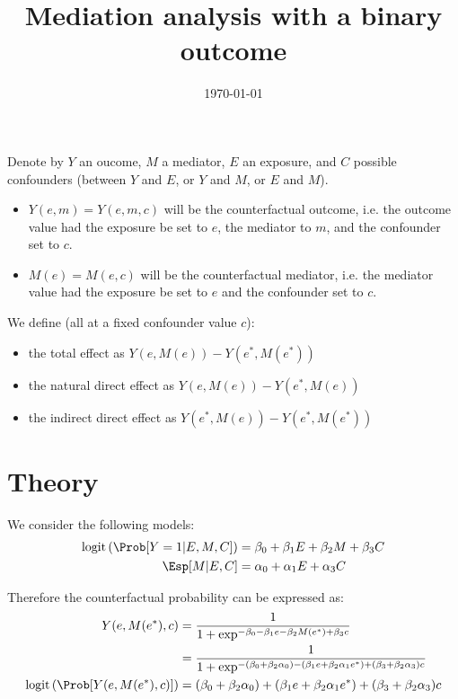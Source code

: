 \documentclass[12pt]{article}
\date{\today}
\title{Mediation analysis with a binary outcome}
\begin{document}
\maketitle
Denote by \(Y\) an oucome, \(M\) a mediator, \(E\) an exposure, and
\(C\) possible confounders (between \(Y\) and \(E\), or \(Y\) and
\(M\), or \(E\) and \(M\)).
\begin{itemize}
\item \(Y(e,m)=Y(e,m,c)\) will be the counterfactual outcome, i.e. the outcome
value had the exposure be set to \(e\), the mediator to \(m\), and the confounder set to \(c\).
\item \(M(e)=M(e,c)\) will be the counterfactual mediator, i.e. the mediator
value had the exposure be set to \(e\) and the confounder set to \(c\).
\end{itemize}

\bigskip

We define (all at a fixed confounder value \(c\)):
\begin{itemize}
\item the total effect as \(Y(e,M(e))-Y(e^*,M(e^*))\)
\item the natural direct effect as \(Y(e,M(e))-Y(e^*,M(e))\)
\item the indirect direct effect as \(Y(e^*,M(e))-Y(e^*,M(e^*))\)
\end{itemize}

\section{Theory}
\label{sec:orge90f290}
We consider the following models:
\begin{align*}
\text{logit}\left(\Prob[Y=1|E,M,C]\right) &= \beta_0 + \beta_1 E + \beta_2 M + \beta_3 C \\
\Esp[M|E,C] &= \alpha_0 + \alpha_1 E + \alpha_3 C
\end{align*}

Therefore the counterfactual probability can be expressed as:
\begin{align*}
Y(e,M(e^*),c) &= \frac{1}{1+\exp^{-\beta_0 - \beta_1 e - \beta_2 M(e^*) + \beta_3 c}} \\
              &= \frac{1}{1+\exp^{-(\beta_0+\beta_2 \alpha_0) - (\beta_1 e + \beta_2 \alpha_1 e^*) + (\beta_3 + \beta_2 \alpha_3) c}} \\
\text{logit}\left(\Prob[Y(e,M(e^*),c)]\right) &= (\beta_0+\beta_2 \alpha_0) + (\beta_1 e + \beta_2 \alpha_1 e^*) + (\beta_3 + \beta_2 \alpha_3) c
\end{align*}
\end{document}
